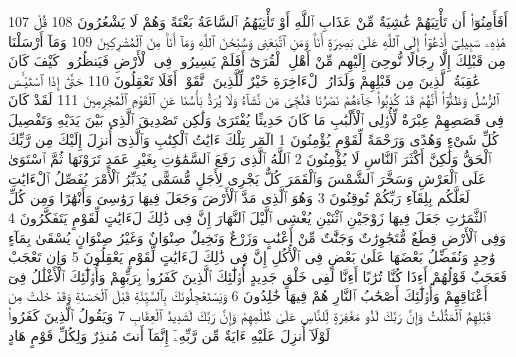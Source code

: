 {\tiny\colorbox{cl_aya}{107}} أَفَأَمِنُوٓا۟ أَن تَأْتِيَهُمْ غَٰشِيَةٌ مِّنْ عَذَابِ ٱللَّهِ أَوْ تَأْتِيَهُمُ ٱلسَّاعَةُ بَغْتَةً وَهُمْ لَا يَشْعُرُونَ
{\tiny\colorbox{cl_aya}{108}} قُلْ هَٰذِهِۦ سَبِيلِىٓ أَدْعُوٓا۟ إِلَى ٱللَّهِ عَلَىٰ بَصِيرَةٍ أَنَا۠ وَمَنِ ٱتَّبَعَنِى وَسُبْحَٰنَ ٱللَّهِ وَمَآ أَنَا۠ مِنَ ٱلْمُشْرِكِينَ
{\tiny\colorbox{cl_aya}{109}} وَمَآ أَرْسَلْنَا مِن قَبْلِكَ إِلَّا رِجَالًا نُّوحِىٓ إِلَيْهِم مِّنْ أَهْلِ ٱلْقُرَىٰٓ أَفَلَمْ يَسِيرُوا۟ فِى ٱلْأَرْضِ فَيَنظُرُوا۟ كَيْفَ كَانَ عَٰقِبَةُ ٱلَّذِينَ مِن قَبْلِهِمْ وَلَدَارُ ٱلْءَاخِرَةِ خَيْرٌ لِّلَّذِينَ ٱتَّقَوْا۟ أَفَلَا تَعْقِلُونَ
{\tiny\colorbox{cl_aya}{110}} حَتَّىٰٓ إِذَا ٱسْتَيْـَٔسَ ٱلرُّسُلُ وَظَنُّوٓا۟ أَنَّهُمْ قَدْ كُذِبُوا۟ جَآءَهُمْ نَصْرُنَا فَنُجِّىَ مَن نَّشَآءُ وَلَا يُرَدُّ بَأْسُنَا عَنِ ٱلْقَوْمِ ٱلْمُجْرِمِينَ
{\tiny\colorbox{cl_aya}{111}} لَقَدْ كَانَ فِى قَصَصِهِمْ عِبْرَةٌ لِّأُو۟لِى ٱلْأَلْبَٰبِ مَا كَانَ حَدِيثًا يُفْتَرَىٰ وَلَٰكِن تَصْدِيقَ ٱلَّذِى بَيْنَ يَدَيْهِ وَتَفْصِيلَ كُلِّ شَىْءٍ وَهُدًى وَرَحْمَةً لِّقَوْمٍ يُؤْمِنُونَ
{\tiny\colorbox{cl_aya}{1}} الٓمٓر تِلْكَ ءَايَٰتُ ٱلْكِتَٰبِ وَٱلَّذِىٓ أُنزِلَ إِلَيْكَ مِن رَّبِّكَ ٱلْحَقُّ وَلَٰكِنَّ أَكْثَرَ ٱلنَّاسِ لَا يُؤْمِنُونَ
{\tiny\colorbox{cl_aya}{2}} ٱللَّهُ ٱلَّذِى رَفَعَ ٱلسَّمَٰوَٰتِ بِغَيْرِ عَمَدٍ تَرَوْنَهَا ثُمَّ ٱسْتَوَىٰ عَلَى ٱلْعَرْشِ وَسَخَّرَ ٱلشَّمْسَ وَٱلْقَمَرَ كُلٌّ يَجْرِى لِأَجَلٍ مُّسَمًّى يُدَبِّرُ ٱلْأَمْرَ يُفَصِّلُ ٱلْءَايَٰتِ لَعَلَّكُم بِلِقَآءِ رَبِّكُمْ تُوقِنُونَ
{\tiny\colorbox{cl_aya}{3}} وَهُوَ ٱلَّذِى مَدَّ ٱلْأَرْضَ وَجَعَلَ فِيهَا رَوَٰسِىَ وَأَنْهَٰرًا وَمِن كُلِّ ٱلثَّمَرَٰتِ جَعَلَ فِيهَا زَوْجَيْنِ ٱثْنَيْنِ يُغْشِى ٱلَّيْلَ ٱلنَّهَارَ إِنَّ فِى ذَٰلِكَ لَءَايَٰتٍ لِّقَوْمٍ يَتَفَكَّرُونَ
{\tiny\colorbox{cl_aya}{4}} وَفِى ٱلْأَرْضِ قِطَعٌ مُّتَجَٰوِرَٰتٌ وَجَنَّٰتٌ مِّنْ أَعْنَٰبٍ وَزَرْعٌ وَنَخِيلٌ صِنْوَانٌ وَغَيْرُ صِنْوَانٍ يُسْقَىٰ بِمَآءٍ وَٰحِدٍ وَنُفَضِّلُ بَعْضَهَا عَلَىٰ بَعْضٍ فِى ٱلْأُكُلِ إِنَّ فِى ذَٰلِكَ لَءَايَٰتٍ لِّقَوْمٍ يَعْقِلُونَ
{\tiny\colorbox{cl_aya}{5}} وَإِن تَعْجَبْ فَعَجَبٌ قَوْلُهُمْ أَءِذَا كُنَّا تُرَٰبًا أَءِنَّا لَفِى خَلْقٍ جَدِيدٍ أُو۟لَٰٓئِكَ ٱلَّذِينَ كَفَرُوا۟ بِرَبِّهِمْ وَأُو۟لَٰٓئِكَ ٱلْأَغْلَٰلُ فِىٓ أَعْنَاقِهِمْ وَأُو۟لَٰٓئِكَ أَصْحَٰبُ ٱلنَّارِ هُمْ فِيهَا خَٰلِدُونَ
{\tiny\colorbox{cl_aya}{6}} وَيَسْتَعْجِلُونَكَ بِٱلسَّيِّئَةِ قَبْلَ ٱلْحَسَنَةِ وَقَدْ خَلَتْ مِن قَبْلِهِمُ ٱلْمَثُلَٰتُ وَإِنَّ رَبَّكَ لَذُو مَغْفِرَةٍ لِّلنَّاسِ عَلَىٰ ظُلْمِهِمْ وَإِنَّ رَبَّكَ لَشَدِيدُ ٱلْعِقَابِ
{\tiny\colorbox{cl_aya}{7}} وَيَقُولُ ٱلَّذِينَ كَفَرُوا۟ لَوْلَآ أُنزِلَ عَلَيْهِ ءَايَةٌ مِّن رَّبِّهِۦٓ إِنَّمَآ أَنتَ مُنذِرٌ وَلِكُلِّ قَوْمٍ هَادٍ
